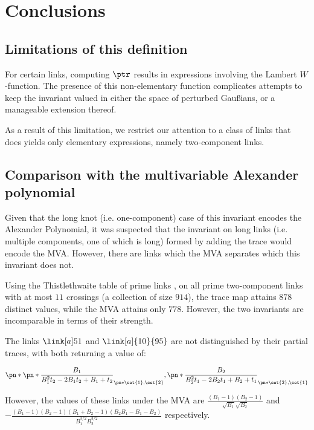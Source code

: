\chapter{Conclusions}\label{ch:conclusions}

\section{Limitations of this definition}\label{sec:limitations}
For certain links, computing $\ptr$ results in expressions involving the Lambert
$W$-function. The presence of this non-elementary function complicates attempts
to keep the invariant valued in either the space of perturbed Gaußians, or a
manageable extension thereof.

As a result of this limitation, we restrict our attention to a class of links
that does yields only elementary expressions, namely two-component links.

\section{Comparison with the multivariable Alexander polynomial}
\label{sec:compare_MVA}

Given that the long knot (i.e. one-component) case of this invariant
encodes the Alexander Polynomial, it was suspected that the invariant on long
links (i.e. multiple components, one of which is long) formed by adding the
trace would encode the \ac{MVA}. However, there are links which the \ac{MVA}
separates which this invariant does not.

Using the Thistlethwaite table of prime links \cite{knotatlas}, on all prime
two-component links with at most $11$ crossings (a collection of size $914$),
the trace map attains $878$ distinct values, while the MVA attains only $778$.
However, the two invariants are incomparable in terms of their strength.

The links $\link[a]51$ and $\link[a]{10}{95}$ are not distinguished by their
partial traces, with both returning a value of:

\begin{equation}
        \pn*{
                \pn*{
                        \frac{B_1}{B_1^2 t_2 -2 B_1 t_2 +B_1+t_2}
                }_{\pn*{\set{1},\set{2}}},
                \pn*{
                        \frac{B_2}{B_2^2 t_1 -2 B_2 t_1 +B_2+t_1}
                }_{\pn*{\set{2},\set{1}}}
}
\end{equation}

However, the values of these links under the \ac{MVA} are
$\frac{\left(B_1-1\right) \left(B_2-1\right)}{\sqrt{B_1} \sqrt{B_2}}
$ and $-\frac{\left(B_1-1\right) \left(B_2-1\right) \left(B_1+B_2-1\right)
        \left(B_2 B_1-B_1-B_2\right)}{B_1^{3/2} B_2^{3/2}}$ respectively.

